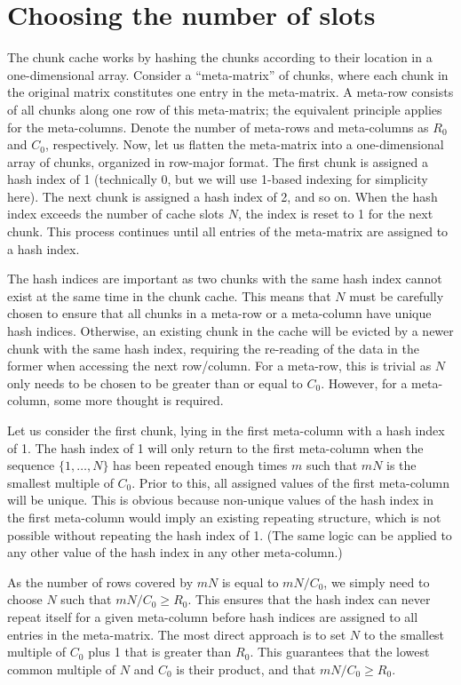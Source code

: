 \documentclass{article}
\begin{document}
\section*{Choosing the number of slots}
The chunk cache works by hashing the chunks according to their location in a one-dimensional array.
Consider a ``meta-matrix'' of chunks, where each chunk in the original matrix constitutes one entry in the meta-matrix.
A meta-row consists of all chunks along one row of this meta-matrix; the equivalent principle applies for the meta-columns.
Denote the number of meta-rows and meta-columns as $R_0$ and $C_0$, respectively.
Now, let us flatten the meta-matrix into a one-dimensional array of chunks, organized in row-major format.
The first chunk is assigned a hash index of 1 (technically 0, but we will use 1-based indexing for simplicity here).
The next chunk is assigned a hash index of 2, and so on.
When the hash index exceeds the number of cache slots $N$, the index is reset to 1 for the next chunk.
This process continues until all entries of the meta-matrix are assigned to a hash index.

The hash indices are important as two chunks with the same hash index cannot exist at the same time in the chunk cache.
This means that $N$ must be carefully chosen to ensure that all chunks in a meta-row or a meta-column have unique hash indices.
Otherwise, an existing chunk in the cache will be evicted by a newer chunk with the same hash index, requiring the re-reading of the data in the former when accessing the next row/column.
For a meta-row, this is trivial as $N$ only needs to be chosen to be greater than or equal to $C_0$.
However, for a meta-column, some more thought is required.

Let us consider the first chunk, lying in the first meta-column with a hash index of 1.
The hash index of 1 will only return to the first meta-column when the sequence $\{1, \ldots, N\}$ has been repeated enough times $m$ such that $mN$ is the smallest multiple of $C_0$.
Prior to this, all assigned values of the first meta-column will be unique.
This is obvious because non-unique values of the hash index in the first meta-column would imply an existing repeating structure, which is not possible without repeating the hash index of 1.
(The same logic can be applied to any other value of the hash index in any other meta-column.)

As the number of rows covered by $mN$ is equal to $mN/C_0$, we simply need to choose $N$ such that $mN/C_0 \ge R_0$.
This ensures that the hash index can never repeat itself for a given meta-column before hash indices are assigned to all entries in the meta-matrix.
The most direct approach is to set $N$ to the smallest multiple of $C_0$ plus 1 that is greater than $R_0$.
This guarantees that the lowest common multiple of $N$ and $C_0$ is their product, and that $mN/C_0 \ge R_0$.
\end{document}
